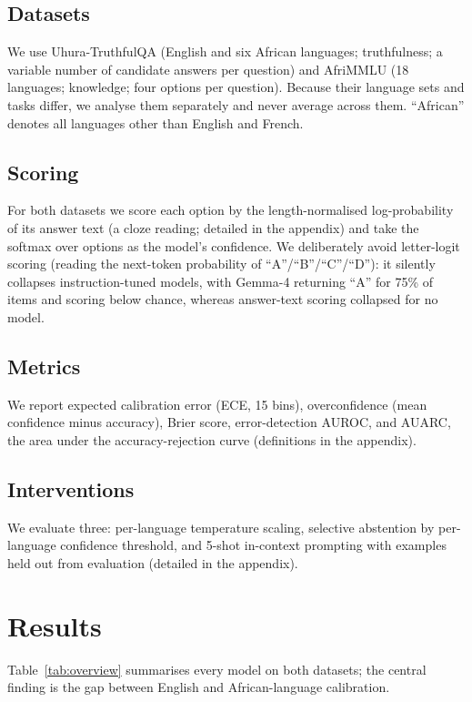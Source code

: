 \documentclass[pmlr]{jmlr}%
\begin{document}
\subsection{Datasets}
We use Uhura-TruthfulQA \citep{uhura} (English and six African languages; truthfulness; a variable
number of candidate answers per question) and AfriMMLU \citep{irokobench} (18 languages; knowledge;
four options per question). Because their language sets and tasks differ, we analyse them separately
and never average across them. ``African'' denotes all languages other than English and French.

\subsection{Scoring}
For both datasets we score each option by the length-normalised log-probability of its answer text
(a cloze reading; detailed in the appendix) and take the softmax over options as the model's
confidence. We deliberately avoid letter-logit scoring (reading the next-token probability of
``A''/``B''/``C''/``D''): it silently collapses instruction-tuned models, with Gemma-4 returning
``A'' for 75\% of items and scoring below chance, whereas answer-text scoring collapsed for no model.

\subsection{Metrics}
We report expected calibration error (ECE, 15 bins), overconfidence (mean confidence minus accuracy),
Brier score, error-detection AUROC, and AUARC, the area under the accuracy-rejection curve
(definitions in the appendix).

\subsection{Interventions}
We evaluate three: per-language temperature scaling, selective abstention by per-language confidence
threshold, and 5-shot in-context prompting with examples held out from evaluation (detailed in the
appendix).

\section{Results}
Table~\ref{tab:overview} summarises every model on both datasets; the central finding is the gap
between English and African-language calibration.
\end{document}

